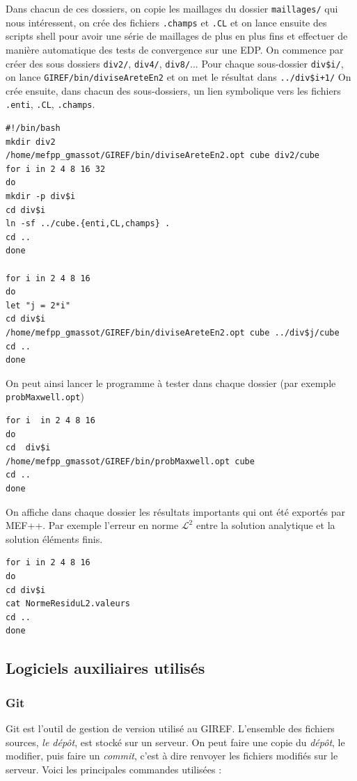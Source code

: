 \documentclass[a4paper,12pt]{article}
\begin{document}
Dans chacun de ces dossiers, on copie les maillages du dossier \texttt{maillages/} qui nous intéressent, on crée des fichiers \texttt{.champs} et \texttt{.CL}
et on lance ensuite des scripts shell pour avoir une série de maillages de plus en plus fins et effectuer de manière automatique des tests de convergence sur une EDP.
\newline
\newline
On commence par créer des sous dossiers \texttt{div2/}, \texttt{div4/}, \texttt{div8/}...
Pour chaque sous-dossier \texttt{div\$i/}, on lance \texttt{GIREF/bin/diviseAreteEn2} et on met le résultat dans \texttt{../div\$i+1/}
On crée ensuite, dans chacun des sous-dossiers, un lien symbolique vers les fichiers \texttt{.enti}, \texttt{.CL}, \texttt{.champs}.

\begin{verbatim}
#!/bin/bash
mkdir div2
/home/mefpp_gmassot/GIREF/bin/diviseAreteEn2.opt cube div2/cube
for i in 2 4 8 16 32
do
mkdir -p div$i
cd div$i
ln -sf ../cube.{enti,CL,champs} .
cd ..
done

for i in 2 4 8 16
do
let "j = 2*i"
cd div$i
/home/mefpp_gmassot/GIREF/bin/diviseAreteEn2.opt cube ../div$j/cube
cd ..
done
\end{verbatim}
On peut ainsi lancer le programme à tester dans chaque dossier (par exemple \texttt{probMaxwell.opt})
\begin{verbatim}
for i  in 2 4 8 16 
do
cd  div$i
/home/mefpp_gmassot/GIREF/bin/probMaxwell.opt cube
cd ..
done
\end{verbatim}
On affiche dans chaque dossier les résultats importants qui ont été exportés par MEF++. Par exemple l'erreur en norme $\mathcal{L}^{2}$ entre la solution analytique
et la solution éléments finis.
\begin{verbatim}
for i in 2 4 8 16
do
cd div$i
cat NormeResiduL2.valeurs
cd ..
done 
\end{verbatim}
\subsection{Logiciels auxiliaires utilisés}
\subsubsection{Git}
Git est l'outil de gestion de version utilisé au GIREF. L'ensemble des fichiers sources, \emph{le dépôt}, est stocké sur un serveur.
On peut faire une copie du \emph{dépôt}, le modifier, puis faire un \emph{commit}, c'est à dire renvoyer les fichiers modifiés sur le serveur. 
Voici les principales commandes utilisées :
\end{document}
